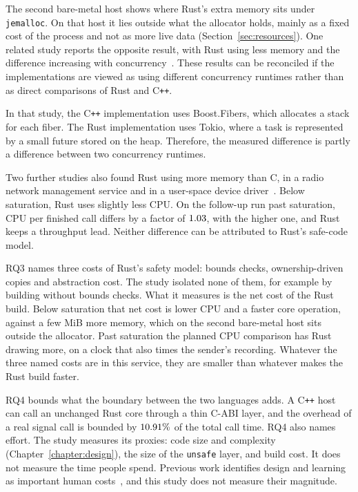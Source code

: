 \documentclass[english,oneside,a4paper,censored,csm,software-track-2020]{HYthesisML}
\begin{document}
The second bare-metal host shows where Rust's extra memory sits under
\texttt{jemalloc}. On that host it lies outside what the allocator holds, mainly as a fixed
cost of the process and not as more live data (Section~\ref{sec:resources}). One related study reports the opposite
result, with Rust using less memory and the difference increasing with
concurrency~\cite{karlback2021ran}. These results can be reconciled if the
implementations are viewed as using different concurrency runtimes rather than
as direct comparisons of Rust and C\texttt{++}.

In that study, the C\texttt{++} implementation uses Boost.Fibers, which
allocates a stack for each fiber. The Rust implementation uses Tokio, where a
task is represented by a small future stored on the heap. Therefore, the
measured difference is partly a difference between two concurrency runtimes.

Two further studies also found Rust using more memory than C, in a radio
network management service and in a user-space device
driver~\cite{olsson2023ranmgmt,sundvisson2026drivers}. Below saturation, Rust
uses slightly less CPU. On the follow-up run past saturation, CPU per finished
call differs by a factor of $1.03$, with
\ProbeAfterCpuPerOpHigher{} the higher one, and Rust keeps a throughput lead.
Neither difference can be attributed to Rust's safe-code model.

RQ3 names three costs of Rust's safety model: bounds checks, ownership-driven
copies and abstraction cost. The study isolated none of them, for example by
building without bounds checks. What it measures is the net cost of the Rust
build. Below saturation that net cost is lower CPU and a faster core operation, against a few
MiB more memory, which on the second bare-metal host sits outside the allocator. Past
saturation the planned CPU comparison has Rust drawing more, on a clock that also times the
sender's recording. Whatever the
three named costs are in this service, they are smaller than whatever makes the
Rust build faster.

RQ4 bounds what the boundary between the two languages adds. A C\texttt{++} host
can call an unchanged Rust core through a thin C-ABI layer, and the overhead of a
real signal call is bounded by $10.91\%$ of the total call time. RQ4
also names effort. The study measures its proxies: code size and complexity
(Chapter~\ref{chapter:design}), the size of the \texttt{unsafe} layer, and build
cost. It does not measure the time people spend. Previous work identifies design
and learning as important human costs~\cite{fulton2021adopting,crichton2024learning},
and this study does not measure their magnitude.
\end{document}
